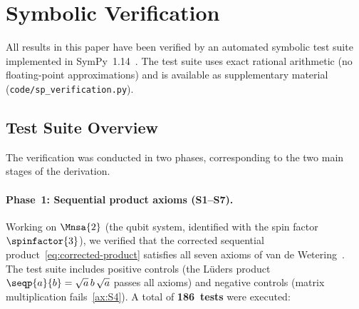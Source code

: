 
\section{Symbolic Verification}\label{app:numerics}

All results in this paper have been verified by an automated symbolic
test suite implemented in SymPy~1.14~\cite{SymPy2017}.  The test suite
uses exact rational arithmetic (no floating-point approximations) and
is available as supplementary material
(\texttt{code/sp\_verification.py}).

\subsection{Test Suite Overview}

The verification was conducted in two phases, corresponding to the
two main stages of the derivation.

\paragraph{Phase~1: Sequential product axioms (S1--S7).}
Working on $\Mnsa{2}$ (the qubit system, identified with the spin
factor $\spinfactor{3}$), we verified that the corrected sequential
product~\eqref{eq:corrected-product} satisfies all seven axioms of
van de Wetering~\cite{vandeWetering2019b}.  The test suite includes
positive controls (the L\"uders product $\seqp{a}{b} = \sqrt{a}\,b\,
\sqrt{a}$ passes all axioms) and negative controls (matrix
multiplication fails~\ref{ax:S4}).
A total of \textbf{186~tests} were executed:

